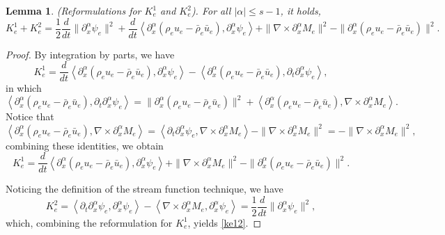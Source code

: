 \documentclass[reqno,twoside,12pt,a4paper]{amsart}
\newcommand{\al}{\alpha}
\newcommand{\pt}{\partial_t}
\newcommand{\pa}{\partial}
\newcommand{\D}{\nabla}
\newtheorem{lemma}{Lemma}[section]
\numberwithin{equation}{section}
\begin{document}
\begin{lemma}\label{lem12}(Reformulations for $K_e^1$ and $K_e^2$). For all $|\al|\leq s-1$, it holds,
\begin{equation}\label{ke12}
    K_e^1+K_e^2=\dfrac{1}{2}\dfrac{d}{dt}\|\pa_x^\al \psi_e\|^2+\dfrac{d}{dt}\left<\partial^\al_x (\rho_e u_e-\bar{\rho}_e\bar{u}_e), \pa_x^\al\psi_e\right>+\|\D\times \pa_x^\al M_e\|^2-\|\pa_x^\al(\rho_e u_e-\bar{\rho}_e\bar{u}_e)\|^2.
\end{equation}
\end{lemma}
\begin{proof} By integration by parts, we have
\[
K_e^1=\dfrac{d}{dt}\left<\partial^\al_x (\rho_e u_e-\bar{\rho}_e\bar{u}_e), \pa_x^\al\psi_e\right>-\left<\pa_x^\al(\rho_e u_e-\bar{\rho}_e\bar{u}_e), \pt \pa_x^\al\psi_e\right>,
\]
in which
\[
\left<\pa_x^\al(\rho_e u_e-\bar{\rho}_e\bar{u}_e), \pt \pa_x^\al\psi_e\right>=\|\pa_x^\al(\rho_e u_e-\bar{\rho}_e\bar{u}_e)\|^2+\left<\pa_x^\al(\rho_e u_e-\bar{\rho}_e\bar{u}_e), \D\times\pa_x^\al M_e\right>.
\]
Notice that
\[
\left<\pa_x^\al(\rho_e u_e-\bar{\rho}_e\bar{u}_e), \D\times\pa_x^\al M_e\right>=\left<\pt\pa_x^\al \psi_e, \D\times\pa_x^\al M_e\right>-\|\D\times \pa_x^\al M_e\|^2=-\|\D\times \pa_x^\al M_e\|^2,
\]
combining these identities, we obtain 
\begin{equation*}
    K_e^1=\dfrac{d}{dt}\left<\partial^\al_x (\rho_e u_e-\bar{\rho}_e\bar{u}_e), \pa_x^\al\psi_e\right>+\|\D\times \pa_x^\al M_e\|^2-\|\pa_x^\al(\rho_e u_e-\bar{\rho}_e\bar{u}_e)\|^2.
\end{equation*}

Noticing the definition of the stream function technique, we have
\[
K_e^2=\left<\pt\pa_x^\al \psi_e,\pa_x^\al\psi_e\right>-\left<\D\times\pa_x^\al M_e, \pa_x^\al \psi_e\right>=\dfrac{1}{2}\dfrac{d}{dt}\|\pa_x^\al \psi_e\|^2,
\]
which, combining the reformulation for $K_e^1$, yields \eqref{ke12}.
\end{proof}
\end{document}
